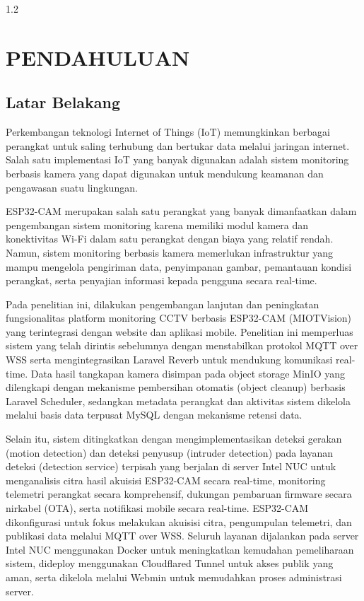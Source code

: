 \begin{spacing}{1.2}
	\chapter{PENDAHULUAN}
\end{spacing}

\vspace{4ex}

\section{Latar Belakang}
Perkembangan teknologi Internet of Things (IoT) memungkinkan berbagai perangkat untuk saling terhubung dan bertukar data melalui jaringan internet. Salah satu implementasi IoT yang banyak digunakan adalah sistem monitoring berbasis kamera yang dapat digunakan untuk mendukung keamanan dan pengawasan suatu lingkungan.

ESP32-CAM merupakan salah satu perangkat yang banyak dimanfaatkan dalam pengembangan sistem monitoring karena memiliki modul kamera dan konektivitas Wi-Fi dalam satu perangkat dengan biaya yang relatif rendah. Namun, sistem monitoring berbasis kamera memerlukan infrastruktur yang mampu mengelola pengiriman data, penyimpanan gambar, pemantauan kondisi perangkat, serta penyajian informasi kepada pengguna secara real-time.

Pada penelitian ini, dilakukan pengembangan lanjutan dan peningkatan fungsionalitas platform monitoring CCTV berbasis ESP32-CAM (MIOTVision) yang terintegrasi dengan website dan aplikasi mobile. Penelitian ini memperluas sistem yang telah dirintis sebelumnya dengan menstabilkan protokol MQTT over WSS serta mengintegrasikan Laravel Reverb untuk mendukung komunikasi real-time. Data hasil tangkapan kamera disimpan pada object storage MinIO yang dilengkapi dengan mekanisme pembersihan otomatis (object cleanup) berbasis Laravel Scheduler, sedangkan metadata perangkat dan aktivitas sistem dikelola melalui basis data terpusat MySQL dengan mekanisme retensi data.

Selain itu, sistem ditingkatkan dengan mengimplementasikan deteksi gerakan (motion detection) dan deteksi penyusup (intruder detection) pada layanan deteksi (detection service) terpisah yang berjalan di server Intel NUC untuk menganalisis citra hasil akuisisi ESP32-CAM secara real-time, monitoring telemetri perangkat secara komprehensif, dukungan pembaruan firmware secara nirkabel (OTA), serta notifikasi mobile secara real-time. ESP32-CAM dikonfigurasi untuk fokus melakukan akuisisi citra, pengumpulan telemetri, dan publikasi data melalui MQTT over WSS. Seluruh layanan dijalankan pada server Intel NUC menggunakan Docker untuk meningkatkan kemudahan pemeliharaan sistem, dideploy menggunakan Cloudflared Tunnel untuk akses publik yang aman, serta dikelola melalui Webmin untuk memudahkan proses administrasi server.

